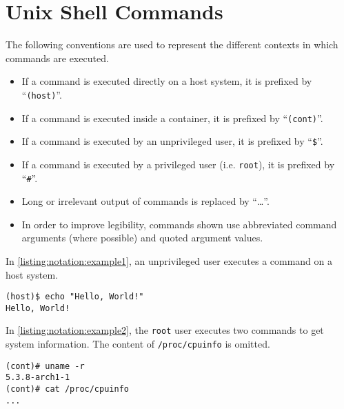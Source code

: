 \section{Unix Shell Commands}
The following conventions are used to represent the different contexts in which commands are executed.

\begin{itemize}
    \item If a command is executed directly on a host system, it is prefixed by ``\lstinline{(host)}''.
    \item If a command is executed inside a container, it is prefixed by ``\lstinline{(cont)}''.
    \item If a command is executed by an unprivileged user, it is prefixed by ``\lstinline{$}''.
    \item If a command is executed by a privileged user (i.e. \lstinline{root}), it is prefixed by ``\lstinline{#}''.
    \item Long or irrelevant output of commands is replaced by ``\ldots''.
    \item In order to improve legibility, commands shown use abbreviated command arguments (where possible) and quoted argument values.
\end{itemize}

\medskip

In \autoref{listing:notation:example1}, an unprivileged user executes a command on a host system.
\begin{lstlisting}[caption={Shell command notation example 1.}, captionpos=b, label={listing:notation:example1}]
(host)$ echo "Hello, World!"
Hello, World!
\end{lstlisting}

\medskip

In \autoref{listing:notation:example2}, the \lstinline{root} user executes two commands to get system information. The content of \lstinline{/proc/cpuinfo} is omitted.
\begin{lstlisting}[caption={Shell command notation example 2.}, captionpos=b, label={listing:notation:example2}]
(cont)# uname -r
5.3.8-arch1-1
(cont)# cat /proc/cpuinfo
...
\end{lstlisting}
